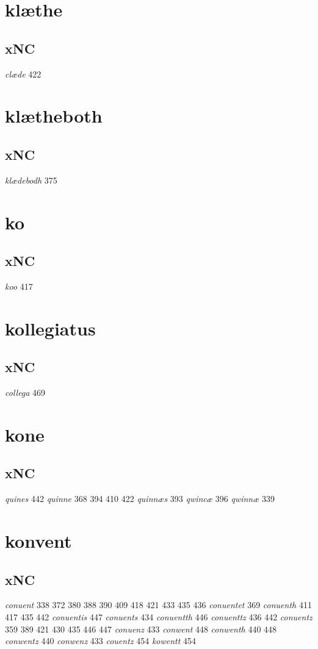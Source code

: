 \documentclass[a4paper,twocolumn]{article}
\begin{document}
\section{klæthe}
\label{sec:org3991e69}
\subsection{xNC}
\label{sec:org2a8f38b}
\emph{clæde} 422 
\section{klætheboth}
\label{sec:org4e5edbc}
\subsection{xNC}
\label{sec:org129d546}
\emph{klædebodh} 375 
\section{ko}
\label{sec:orgeb7d6c9}
\subsection{xNC}
\label{sec:orgc31c084}
\emph{koo} 417 
\section{kollegiatus}
\label{sec:orgdd11dac}
\subsection{xNC}
\label{sec:org8d53e75}
\emph{collega} 469 
\section{kone}
\label{sec:org3237528}
\subsection{xNC}
\label{sec:orgff682e1}
\emph{quines} 442 \emph{quinne} 368 394 410 422 \emph{quinnæs} 393 \emph{qwincæ} 396 \emph{qwinnæ} 339 
\section{konvent}
\label{sec:org79d76a1}
\subsection{xNC}
\label{sec:orgd56b270}
\emph{conuent} 338 372 380 388 390 409 418 421 433 435 436 \emph{conuentet} 369 \emph{conuenth} 411 417 435 442 \emph{conuentis} 447 \emph{conuents} 434 \emph{conuentth} 446 \emph{conuenttz} 436 442 \emph{conuentz} 359 389 421 430 435 446 447 \emph{conuenz} 433 \emph{conwent} 448 \emph{conwenth} 440 448 \emph{conwentz} 440 \emph{conwenz} 433 \emph{couentz} 454 \emph{kowentt} 454 
\end{document}
